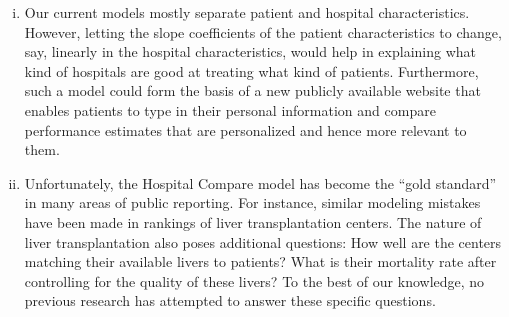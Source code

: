 \documentclass[10pt,twoside]{article}
\theoremstyle{definition}
\theoremstyle{definition}
\begin{document}
\begin{enumerate}[i)]
\item Our current models mostly separate patient and hospital characteristics. However, letting the slope coefficients of the patient characteristics to change, say, linearly in the hospital characteristics, would help in explaining what kind of hospitals are good at treating what kind of patients. Furthermore, such a model could form the basis of a new publicly available website that enables patients to type in their personal information and compare performance estimates that are personalized and hence more relevant to them. 

\item Unfortunately, the Hospital Compare model has become the ``gold standard'' in many areas of public reporting.
For instance, similar modeling mistakes have been made in rankings of liver transplantation centers. The nature of liver transplantation also poses additional questions: How well are the centers matching their available livers to patients? What is their mortality rate after controlling for the quality of these livers? To the best of our knowledge, no previous research has attempted to answer these specific questions. 

\end{enumerate}


%

\end{document}
